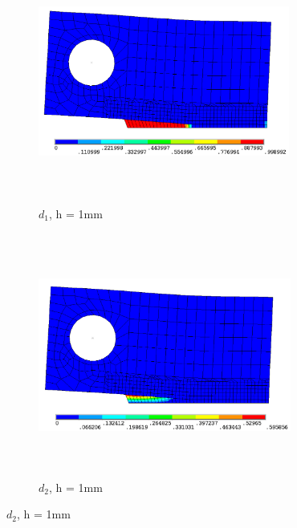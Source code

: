 \documentclass[12pt,a4paper,twoside,openright]{report}
\begin{document}
\begin{figure}[htbp!]
       \captionsetup[subfigure]{justification=centering}
     \begin{subfigure}{0.4\textwidth}
          \includegraphics[width=8.25cm,height=8cm,keepaspectratio]{26.d1-1.png}
         \caption{$d_{1}$, h = 1mm}
         \label{fig:d1-1}
     \end{subfigure}
    \hspace{2cm}
     \captionsetup[subfigure]{justification=centering}
     \begin{subfigure}{0.4\textwidth}
         \includegraphics[width=8.3cm,height=8cm,keepaspectratio]{26.d2-1.png}
         \caption{$d_{2}$, h = 1mm}
         \label{fig:d2-1}
     \end{subfigure}
\end{figure}
\FloatBarrier
\end{document}
